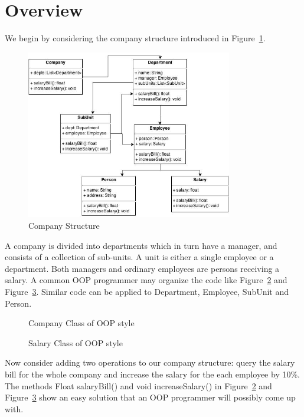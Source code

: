 
\section{Overview}\label{subsec:overview}

We begin by considering the company structure introduced in Figure~\ref{company_structure}.

\begin{figure}[ht!]
\centering
\includegraphics[width=90mm]{Company.jpg}
\caption{Company Structure \label{company_structure}}
\end{figure}

A company is divided into departments which in turn have a manager, and consists of a collection of sub-units. A unit is either a single employee or a department. Both managers and ordinary employees are persons receiving a salary. A common OOP programmer may organize the code like Figure~\ref{oop_company} and Figure~\ref{oop_salary}. Similar code can be applied to Department, Employee, SubUnit and Person. 

\begin{figure}[tb]
\vspace{-.1in}
\caption{Company Class of OOP style}
\label{oop_company}
\end{figure}

\begin{figure}[tb]
\vspace{-.1in}
\caption{Salary Class of OOP style}
\label{oop_salary}
\end{figure}

Now consider adding two operations to our company structure: query the salary bill for the whole company and increase the salary for the each employee by 10\%. The methods Float salaryBill() and void increaseSalary() in Figure~\ref{oop_company} and Figure~\ref{oop_salary} show an easy solution that an OOP programmer will possibly come up with. 

